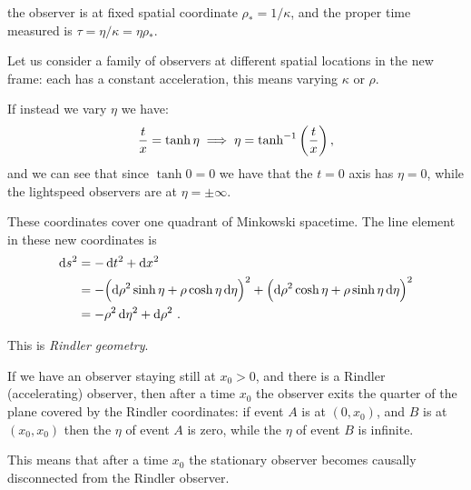 \documentclass[main.tex]{subfiles}
\begin{document}
the observer is at fixed spatial coordinate \(\rho_{*} = 1 / \kappa \), and the proper time measured is \(\tau = \eta / \kappa = \eta \rho_{*}\). 

Let us consider a family of observers at different spatial locations in the new frame: each has a constant acceleration, this means varying \(\kappa \) or \(\rho \).

If instead we vary \(\eta \) we have: 
%
\begin{align}
  \frac{t}{x} = \tanh \eta \implies 
  \eta = \tanh^{-1} \qty(\frac{t}{x})
\,,
\end{align}
%
and we can see that since \(\tanh 0 = 0 \) we have that the \(t=0\) axis has \(\eta = 0\), while the lightspeed observers are at \(\eta = \pm \infty\). 

These coordinates cover one quadrant of Minkowski spacetime. 
The line element in these new coordinates is 
%
\begin{subequations}
\begin{align}
  \dd{s^2} &= - \dd{t^2} + \dd{x^2}   \\
  &= - \qty(\dd{\rho^2} \sinh \eta  + \rho \cosh \eta \dd{\eta })^2
  + \qty( \dd{\rho^2} \cosh \eta + \rho \sinh \eta \dd{\eta })^2  \\
  &= - \rho^2 \dd{\eta^2} + \dd{\rho^2}
\,.
\end{align}
\end{subequations}
%

This is \emph{Rindler geometry}. 

If we have an observer staying still at \(x_0 >0\), and there is a Rindler (accelerating) observer, then after a time \(x_0\) the observer exits the quarter of the plane covered by the Rindler coordinates: if event \(A\) is at \((0, x_0 )\), and \(B\) is at \((x_0 , x_0 )\) then the \(\eta \) of event \(A\) is zero, while the \(\eta \) of event \(B\) is infinite. 

This means that after a time \(x_0 \) the stationary observer becomes causally disconnected from the Rindler observer.
\end{document}
